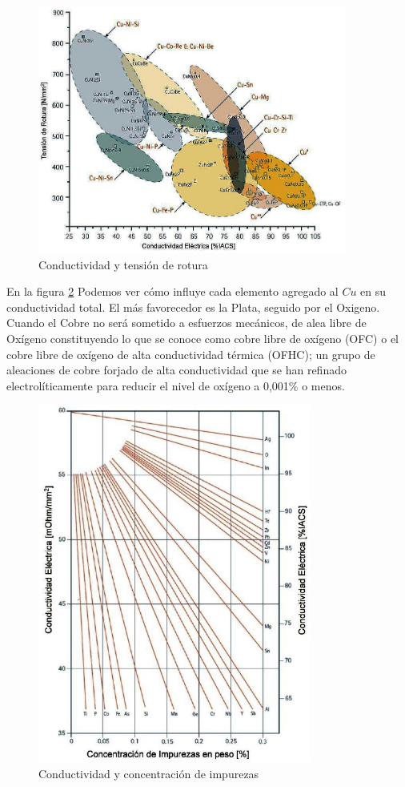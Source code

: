 \begin{figure}[H]
    \centering
    \includegraphics[width=0.9\textwidth]{./Figures/fig46}
	\caption{Conductividad y tensión de rotura}
	\label{fig:46}
\end{figure}

En la figura \ref{fig:47} Podemos ver cómo influye cada elemento agregado al $Cu$ en su conductividad total. El más favorecedor es la Plata, seguido por el Oxigeno. Cuando el Cobre no será sometido a esfuerzos mecánicos, de alea libre de Oxígeno constituyendo lo que se conoce como cobre libre de oxígeno (OFC) o el cobre libre de oxígeno de alta conductividad térmica (OFHC); un grupo de aleaciones de cobre forjado de alta conductividad que se han refinado electrolíticamente para reducir el nivel de oxígeno a 0,001\% o menos.

\begin{figure}[H]
    \centering
    \includegraphics[width=0.8\textwidth]{./Figures/fig47}
	\caption{Conductividad y concentración de impurezas}
	\label{fig:47}
\end{figure}


